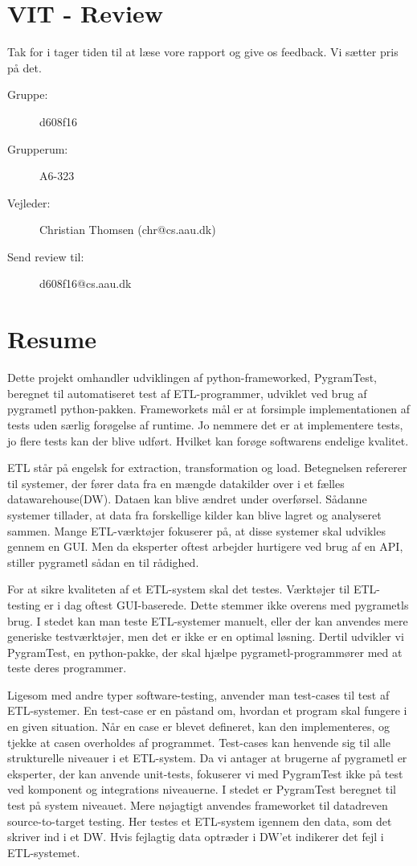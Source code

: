 \section*{VIT - Review}
Tak for i tager tiden til at læse vore rapport og give os feedback. Vi sætter pris på det.
\begin{description}
\item[Gruppe:] d608f16
\item[Grupperum:] A6-323
\item[Vejleder:]Christian Thomsen (chr@cs.aau.dk)
\item[Send review til:] d608f16@cs.aau.dk
\end{description}

\section*{Resume}
\setcounter{page}{0}
Dette projekt omhandler udviklingen af python-frameworked, PygramTest, beregnet til automatiseret test af ETL-programmer, udviklet ved brug af pygrametl python-pakken. Frameworkets mål er at forsimple implementationen af tests uden særlig forøgelse af runtime. Jo nemmere det er at implementere tests, jo flere tests kan der blive udført. Hvilket kan forøge softwarens endelige kvalitet.  

ETL står på engelsk for extraction, transformation og load. Betegnelsen refererer til systemer, der fører data fra en mængde datakilder over i et fælles datawarehouse(DW). Dataen kan blive ændret  under overførsel. Sådanne systemer tillader, at data fra forskellige kilder kan blive lagret og analyseret sammen. Mange ETL-værktøjer fokuserer på, at disse systemer skal udvikles gennem en GUI. Men da eksperter oftest arbejder hurtigere ved brug af en API, stiller pygrametl sådan en til rådighed.   

For at sikre kvaliteten af et ETL-system skal det testes. Værktøjer til ETL-testing er i dag oftest GUI-baserede. Dette stemmer ikke overens med pygrametls brug. I stedet kan man teste ETL-systemer manuelt, eller der kan anvendes mere generiske testværktøjer, men det er ikke er en optimal løsning. Dertil udvikler vi PygramTest, en python-pakke, der skal hjælpe pygrametl-programmører med at teste deres programmer.

Ligesom med andre typer software-testing, anvender man test-cases til test af  ETL-systemer. En test-case er en påstand om, hvordan et program skal fungere i en given situation. Når en case er blevet defineret, kan den implementeres, og tjekke at casen overholdes af programmet. Test-cases kan henvende sig til alle strukturelle niveauer i et ETL-system. Da vi antager at brugerne af pygrametl er eksperter, der kan anvende unit-tests, fokuserer vi med PygramTest ikke på test ved komponent og integrations niveauerne. I stedet er PygramTest beregnet til test på system niveauet. Mere nøjagtigt anvendes frameworket til datadreven source-to-target testing. Her testes et ETL-system igennem den data, som det skriver ind i et DW. Hvis fejlagtig data optræder i DW’et indikerer det fejl i ETL-systemet. 


